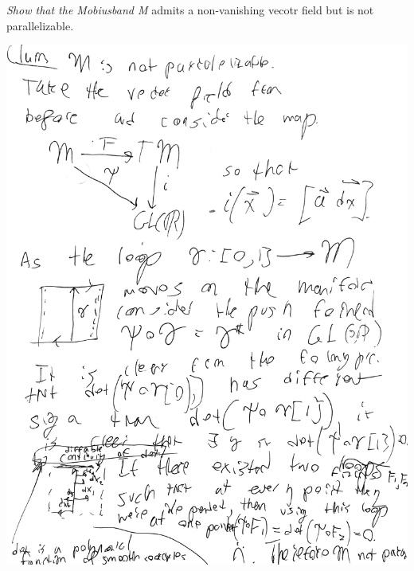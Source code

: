 \documentclass[11pt]{amsart}
\theoremstyle{definition}
\numberwithin{theorem}{section}
\numberwithin{definition}{section}
\numberwithin{equation}{section}
\begin{document}
\medskip {}  \emph{Show that the Mobiusband M} admits a non-vanishing vecotr field but is not parallelizable. 

	

	
\newpage
\includegraphics[width=\textwidth,height=\textheight]{image.png}
\end{document}

